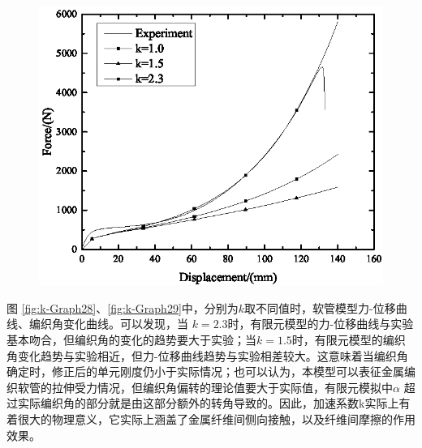 \begin{figure}[!htp]
{	\includegraphics[height=0.2\textheight]{figure/chap5/Graph29}
	\label{fig:k-Graph28}
}
\label{fig:k-results}
\end{figure}






图 \ref{fig:k-Graph28}、\ref{fig:k-Graph29}中，分别为$ k $取不同值时，软管模型力-位移曲线、编织角变化曲线。可以发现，当
$ k=2.3 $时，有限元模型的力-位移曲线与实验基本吻合，但编织角的变化的趋势要大于实验；当$ k=1.5 $时，有限元模型的编织角变化趋势与实验相近，但力-位移曲线趋势与实验相差较大。这意味着当编织角确定时，修正后的单元刚度仍小于实际情况；也可以认为，本模型可以表征金属编织软管的拉伸受力情况，但编织角偏转的理论值要大于实际值，有限元模拟中$ \alpha $ 超过实际编织角的部分就是由这部分额外的转角导致的。因此，加速系数k实际上有着很大的物理意义，它实际上涵盖了金属纤维间侧向接触，以及纤维间摩擦的作用效果。


